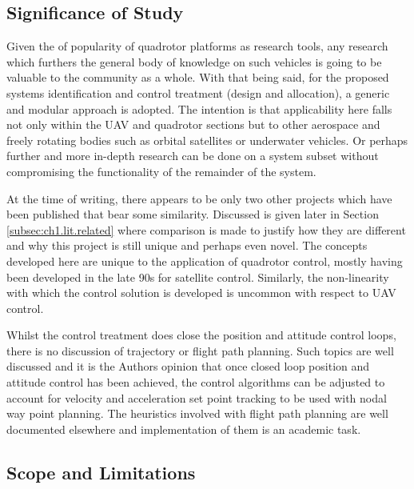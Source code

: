 \subsection{Significance of Study}
\label{subsec:ch1.foreward.significance}
Given the of popularity of quadrotor platforms as research tools, any research which furthers the general body of knowledge on such vehicles is going to be valuable to the community as a whole. With that being said, for the proposed systems identification and control treatment (design and allocation), a generic and modular approach is adopted. The intention is that applicability here falls not only within the UAV and quadrotor sections but to other aerospace and freely rotating bodies such as orbital satellites or underwater vehicles. Or perhaps further and more in-depth research can be done on a system subset without compromising the functionality of the remainder of the system. 
\par
At the time of writing, there appears to be only two other projects which have been published that bear some similarity. Discussed is given later in Section \ref{subsec:ch1.lit.related} where comparison is made to justify how they are different and why this project is still unique and perhaps even novel. The concepts developed here are unique to the application of quadrotor control, mostly having been developed in the late 90s for satellite control. Similarly, the non-linearity with which the control solution is developed is uncommon with respect to UAV control.
\par
Whilst the control treatment does close the position  and attitude control loops, there is no discussion of trajectory or flight path planning. Such topics are well discussed and it is the Authors opinion that once closed loop position and attitude control has been achieved, the control algorithms can be adjusted to account for velocity and acceleration set point tracking to be used with nodal way point planning. The heuristics involved with flight path planning are well documented elsewhere and implementation of them is an academic task.
\subsection{Scope and Limitations}
\label{subsec:ch1.foreward.scopeandlim}
